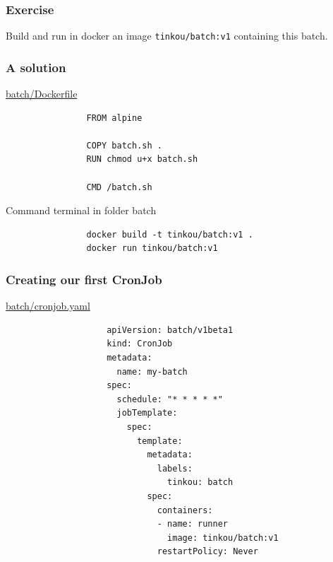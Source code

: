 	\begin{frame}[fragile]
		\frametitle{Exercise}
		
		Build and run in docker an image \verb|tinkou/batch:v1| containing this batch.
	\end{frame}

	\begin{frame}[fragile]
		\frametitle{A solution}
		
		\begin{block}{\href{https://github.com/Tinkou/trainings/blob/master/trainings/sources/dev-onboarding/files/batch/Dockerfile}{batch/Dockerfile}}
			\begin{verbatim}
				FROM alpine
				
				COPY batch.sh .
				RUN chmod u+x batch.sh
				
				CMD /batch.sh
			\end{verbatim}
		\end{block}
		
		\begin{block}{Command terminal in folder batch}
			\begin{verbatim}
				docker build -t tinkou/batch:v1 .
				docker run tinkou/batch:v1
			\end{verbatim}
		\end{block}
	\end{frame}
				
	\begin{frame}[fragile]
		\frametitle{Creating our first CronJob}
		
		\begin{block}{\href{https://github.com/Tinkou/trainings/blob/master/trainings/sources/dev-onboarding/files/batch/cronjob.yaml}{batch/cronjob.yaml}}
			\begin{tiny}
				\begin{verbatim}
					apiVersion: batch/v1beta1
					kind: CronJob
					metadata:
					  name: my-batch
					spec:
					  schedule: "* * * * *"
					  jobTemplate:
					    spec:
					      template:
					        metadata:
					          labels:
					            tinkou: batch
					        spec:
					          containers:
					          - name: runner
					            image: tinkou/batch:v1
					          restartPolicy: Never
				\end{verbatim}
			\end{tiny}
		\end{block}
	\end{frame}
	
